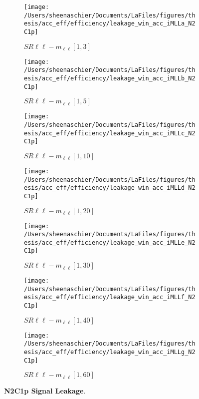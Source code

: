 \begin{figure}
        \centering
    \begin{subfigure}[b]{0.44\textwidth}
        \texttt{[image: /Users/sheenaschier/Documents/LaFiles/figures/thesis/acc\_eff/efficiency/leakage\_win\_acc\_iMLLa\_N2C1p]}
    \caption{$SR\ell\ell-m_{\ell\ell} [1, 3]$}
    \end{subfigure}
    \begin{subfigure}[b]{0.44\textwidth}
        \texttt{[image: /Users/sheenaschier/Documents/LaFiles/figures/thesis/acc\_eff/efficiency/leakage\_win\_acc\_iMLLb\_N2C1p]}
    \caption{$SR\ell\ell-m_{\ell\ell} [1, 5]$}
    \end{subfigure}
    \begin{subfigure}[b]{0.44\textwidth}
        \texttt{[image: /Users/sheenaschier/Documents/LaFiles/figures/thesis/acc\_eff/efficiency/leakage\_win\_acc\_iMLLc\_N2C1p]}
    \caption{$SR\ell\ell-m_{\ell\ell} [1, 10]$}
    \end{subfigure}
    \begin{subfigure}[b]{0.44\textwidth}
        \texttt{[image: /Users/sheenaschier/Documents/LaFiles/figures/thesis/acc\_eff/efficiency/leakage\_win\_acc\_iMLLd\_N2C1p]}
    \caption{$SR\ell\ell-m_{\ell\ell} [1, 20]$}
    \end{subfigure}
    \begin{subfigure}[b]{0.44\textwidth}
        \texttt{[image: /Users/sheenaschier/Documents/LaFiles/figures/thesis/acc\_eff/efficiency/leakage\_win\_acc\_iMLLe\_N2C1p]}
    \caption{$SR\ell\ell-m_{\ell\ell} [1, 30]$}
    \end{subfigure}
    \begin{subfigure}[b]{0.44\textwidth}
        \texttt{[image: /Users/sheenaschier/Documents/LaFiles/figures/thesis/acc\_eff/efficiency/leakage\_win\_acc\_iMLLf\_N2C1p]}
    \caption{$SR\ell\ell-m_{\ell\ell} [1, 40]$}
    \end{subfigure}
    \begin{subfigure}[b]{0.44\textwidth}
        \texttt{[image: /Users/sheenaschier/Documents/LaFiles/figures/thesis/acc\_eff/efficiency/leakage\_win\_acc\_iMLLg\_N2C1p]}
    \caption{$SR\ell\ell-m_{\ell\ell} [1, 60]$}
    \end{subfigure}
    \caption{\textbf{N2C1p Signal Leakage}.}
\end{figure}

